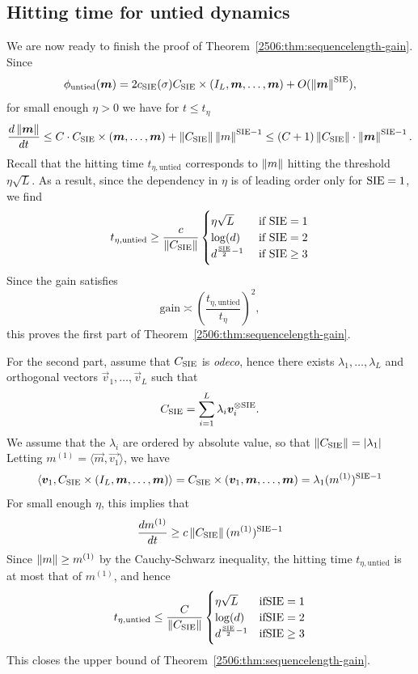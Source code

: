 \subsection{Hitting time for untied dynamics}

We are now ready to finish the proof of Theorem~\ref{2506:thm:sequencelength-gain}. Since
\[ \phi_{\text{untied}}({\boldsymbol{m}}) = 2 c_{\mathrm{SIE}}(\sigma) C_{\mathrm{SIE}} \times (I_L, {\boldsymbol{m}}, \dots, {\boldsymbol{m}}) + O(\left\lVert {\boldsymbol{m}}\right\rVert^{\mathrm{SIE}}), \]
for small enough $\eta > 0$ we have for $t \leq t_\eta$
\[ \frac{d\left\lVert {\boldsymbol{m}}\right\rVert}{dt} \leq C \cdot C_{\mathrm{SIE}} \times ({\boldsymbol{m}}, \dots, {\boldsymbol{m}}) + \left\lVert C_{\mathrm{SIE}}\right\rVert \left\lVert m\right\rVert^{\mathrm{SIE}-1} \leq (C+1)\left\lVert C_{\mathrm{SIE}}\right\rVert\cdot \left\lVert {\boldsymbol{m}}\right\rVert^{\mathrm{SIE}-1}.\]
Recall that the hitting time $t_{\eta, \text{untied}}$ corresponds to $\left\lVert m\right\rVert$ hitting the threshold $\eta\sqrt{L}$. As a result, since the dependency in $\eta$ is of leading order only for $\mathrm{SIE}=1$, we find
\[ t_{\eta, \text{untied}} \geq \frac{c}{\left\lVert C_{\mathrm{SIE}}\right\rVert} \begin{cases}
    \eta\sqrt{L} & \text{ if } \mathrm{SIE}=1 \\
    \log(d) & \text{ if } \mathrm{SIE}=2\\
    d^{\frac{\mathrm{SIE}}2-1} & \text{ if } \mathrm{SIE} \geq 3
\end{cases} \]
Since the gain satisfies 
\[ \mathrm{gain} \asymp  \left(\frac{t_{\eta, \text{untied}}}{t_\eta}\right)^2, \]
this proves the first part of Theorem~\ref{2506:thm:sequencelength-gain}.

For the second part, assume that $C_{\mathrm{SIE}}$ is \emph{odeco}, hence there exists $\lambda_1, \dots, \lambda_L$ and orthogonal vectors $\vec{v}_1, \dots, \vec{v}_L$ such that
\[C_{\mathrm{SIE}} = \sum_{i=1}^L \lambda_i {\boldsymbol{v}}_i^{\otimes \mathrm{SIE}}.\]
We assume that the $\lambda_i$ are ordered by absolute value, so that $\left\lVert C_{\mathrm{SIE}}\right\rVert = |\lambda_1|$
Letting $m^{(1)} = \langle \vec{m}, \vec{v_1} \rangle$, we have
\[  \langle {\boldsymbol{v}}_1, C_{\mathrm{SIE}} \times (I_L, {\boldsymbol{m}}, \dots, {\boldsymbol{m}}) \rangle = C_{\mathrm{SIE}} \times ({\boldsymbol{v}}_1, {\boldsymbol{m}}, \dots, {\boldsymbol{m}}) = \lambda_1 (m^{(1)})^{\mathrm{SIE}-1} \]
For small enough $\eta$, this implies that
\[ \frac{dm^{(1)}}{dt} \geq c \left\lVert C_{\mathrm{SIE}}\right\rVert (m^{(1)})^{\mathrm{SIE}-1} \]
Since $\left\lVert m\right\rVert \geq m^{(1)}$ by the Cauchy-Schwarz inequality, the hitting time $t_{\eta, \text{untied}}$ is at most that of $m^{(1)}$, and hence
\[ t_{\eta, \text{untied}} \leq \frac{C}{\left\lVert C_{\mathrm{SIE}}\right\rVert} \begin{cases}
    \eta\sqrt{L} & \text{if} \mathrm{SIE}=1 \\
    \log(d) & \text{if} \mathrm{SIE}=2\\
    d^{\frac{\mathrm{SIE}}2-1} & \text{if} \mathrm{SIE} \geq 3
    \end{cases}
\]
This closes the upper bound of Theorem~\ref{2506:thm:sequencelength-gain}.

